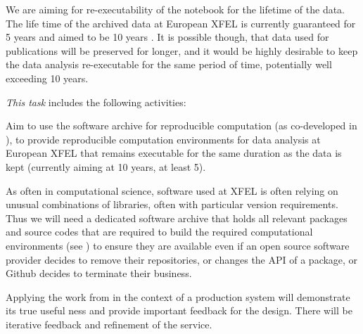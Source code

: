 \begin{task}[
  title=Reproducible X-ray crystallography workflows at European XFEL,
  id=reproducibility-xfel,
  lead=XFEL,
  PM=36,
  wphases={6-48},
  partners={XFEL}
  ]
  We are aiming for re-executability of the notebook for the lifetime
  of the data. The life time of the archived data at European XFEL is
  currently guaranteed for 5 years and aimed to be 10 years
  \cite{EuXFEL-datapolicy-2017}. It is possible though, that data used
  for publications will be preserved for longer, and it would be
  highly desirable to keep the data analysis re-executable for the
  same period of time, potentially well exceeding 10 years.




  \medskip \emph{This task} includes the following activities:
  \begin{compactitem}
  \item Aim to use the software archive for reproducible computation
    (as co-developed in ), to
    provide reproducible computation environments for data analysis at
    European XFEL that remains executable for the same duration as the
    data is kept (currently aiming at 10 years, at least 5).

    As often in computational science, software used at XFEL is often
    relying on unusual combinations of libraries, often with
    particular version requirements. Thus we will need a dedicated
    software archive that holds all relevant packages and source codes
    that are required to build the required computational environments
    (see ) to ensure they are
    available even if an open source software provider decides to
    remove their repositories, or changes the API of a package, or
    Github decides to terminate their business.

    Applying the work from  in the
    context of a production system will demonstrate its true useful
    ness and provide important feedback for the design. There will be
    iterative feedback and refinement of the service.


\end{compactitem}
\end{task}
